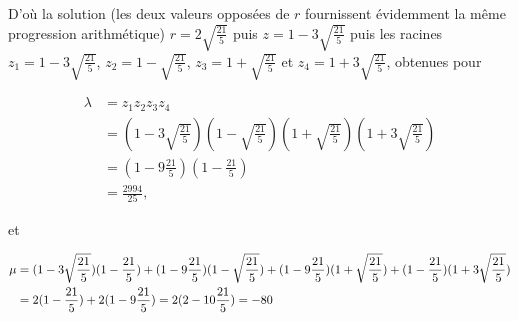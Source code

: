 {{D'où la solution (les deux valeurs opposées de $r$ fournissent évidemment la même progression arithmétique)
$r=2\sqrt{\frac{21}{5}}$ puis $z=1-3\sqrt{\frac{21}{5}}$ puis les racines $z_1=1-3\sqrt{\frac{21}{5}}$, $z_2=1-\sqrt{\frac{21}{5}}$, $z_3=1+\sqrt{\frac{21}{5}}$ et $z_4=1+3\sqrt{\frac{21}{5}}$, obtenues pour 

\begin{align*}
\lambda &= z_1z_2z_3z_4 \\
&= (1-3\sqrt{\frac{21}{5}})(1-\sqrt{\frac{21}{5}})(1+\sqrt{\frac{21}{5}}) (1+3\sqrt{\frac{21}{5}}) \\
&= (1-9\frac{21}{5})(1-\frac{21}{5}) \\
&= \frac{2994}{25},
\end{align*}
 
et 

\begin{align*}\ensuremath
\mu&=(1-3\sqrt{\frac{21}{5}})(1-\frac{21}{5})+(1-9\frac{21}{5})(1-\sqrt{\frac{21}{5}})+(1-9\frac{21}{5})(1+\sqrt{\frac{21}{5}})+(1-\frac{21}{5})(1+3\sqrt{\frac{21}{5}})\\
 &=2(1-\frac{21}{5})+2(1-9\frac{21}{5})=2(2-10\frac{21}{5})=-80
\end{align*}
}
}
